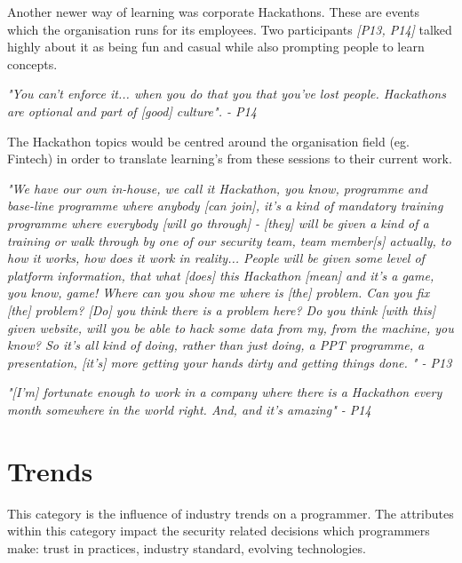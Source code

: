 \newline
\par 
Another newer way of learning  was corporate Hackathons. These are events which the organisation runs for its employees. Two participants \textit{[P13, P14]} talked highly about it as being fun and casual while also prompting people to learn concepts. 
\newline
\par
\textit{"You can't enforce it... when you do that you that you've lost people. Hackathons are optional and part of [good] culture". - P14}
\newline
\par
The Hackathon topics would be centred around the organisation field (eg. Fintech) in order to translate learning's from these sessions to their current work. 
\newline
\par
\textit{"We have our own in-house, we call it Hackathon, you know, programme and base-line programme where anybody [can join], it's a kind of mandatory training programme where everybody [will go through] - [they] will be given a kind of a training or walk through by one of our security team, team member[s] actually, to how it works, how does it work in reality... People will be given some level of platform information, that what [does] this Hackathon [mean] and it's a game, you know, game! Where can you show me where is [the] problem. Can you fix [the] problem? [Do] you think there is a problem here? Do you think [with this] given website, will you be able to hack some data from my, from the machine, you know? So it's all kind of doing, rather than just doing, a PPT programme, a presentation, [it's] more getting your hands dirty and getting things done. " - P13 }
\newline
\par
\textit{"[I'm] fortunate enough to work in a company where there is a Hackathon every month somewhere in the world right. And, and it's amazing" - P14}

\section{Trends}

\par This category is the influence of industry trends on a programmer. The attributes within this category impact the security related decisions which programmers make: trust in practices, industry standard, evolving technologies. 


